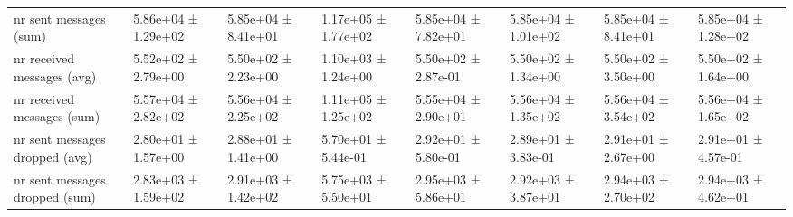 \begin{tabular}{llllllll}
 nr sent messages (sum)             & 5.86e+04 ± 1.29e+02 & 5.85e+04 ± 8.41e+01 & 1.17e+05 ± 1.77e+02   & 5.85e+04 ± 7.82e+01 & 5.85e+04 ± 1.01e+02 & 5.85e+04 ± 8.41e+01 & 5.85e+04 ± 1.28e+02 \\
 nr received messages (avg)         & 5.52e+02 ± 2.79e+00 & 5.50e+02 ± 2.23e+00 & 1.10e+03 ± 1.24e+00   & 5.50e+02 ± 2.87e-01 & 5.50e+02 ± 1.34e+00 & 5.50e+02 ± 3.50e+00 & 5.50e+02 ± 1.64e+00 \\
 nr received messages (sum)         & 5.57e+04 ± 2.82e+02 & 5.56e+04 ± 2.25e+02 & 1.11e+05 ± 1.25e+02   & 5.55e+04 ± 2.90e+01 & 5.56e+04 ± 1.35e+02 & 5.56e+04 ± 3.54e+02 & 5.56e+04 ± 1.65e+02 \\
 nr sent messages dropped (avg)     & 2.80e+01 ± 1.57e+00 & 2.88e+01 ± 1.41e+00 & 5.70e+01 ± 5.44e-01   & 2.92e+01 ± 5.80e-01 & 2.89e+01 ± 3.83e-01 & 2.91e+01 ± 2.67e+00 & 2.91e+01 ± 4.57e-01 \\
 nr sent messages dropped (sum)     & 2.83e+03 ± 1.59e+02 & 2.91e+03 ± 1.42e+02 & 5.75e+03 ± 5.50e+01   & 2.95e+03 ± 5.86e+01 & 2.92e+03 ± 3.87e+01 & 2.94e+03 ± 2.70e+02 & 2.94e+03 ± 4.62e+01 \\
\hline
\end{tabular}